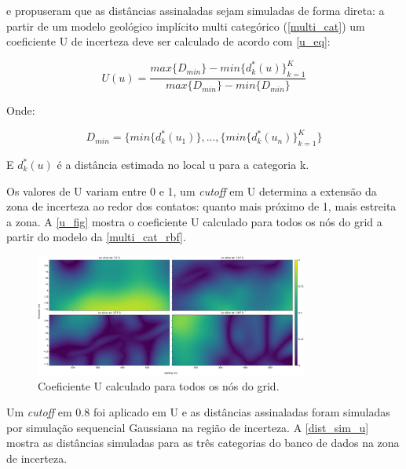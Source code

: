  e \cite{radtke_dissertacao} propuseram que as distâncias assinaladas sejam simuladas de forma direta: a partir de um modelo geológico implícito multi categórico (\autoref{multi_cat}) um coeficiente U de incerteza deve ser calculado de acordo com \autoref{u_eq}:

\begin{equation}\label{u_eq}
    U(u)=\frac{max\{D_{min}\}-min\{d^*_k(u)\}^K_{k=1}}{max\{D_{min}\}-min\{D_{min}\}}
\end{equation}

Onde:

\begin{equation}
    D_{min}=\{min\{d^*_k(u_1)\},...,\{min\{d^*_k(u_n)\}^K_{k=1}\}
\end{equation}

E $d^*_k(u)$ é a distância estimada no local u para a categoria k.

Os valores de U variam entre 0 e 1, um \textit{cutoff} em U determina a extensão da zona de incerteza ao redor dos contatos: quanto mais próximo de 1, mais estreita a zona. A \autoref{u_fig} mostra o coeficiente U calculado para todos os nós do grid a partir do modelo da \autoref{multi_cat_rbf}.

\begin{figure}[!ht]
	\caption{\label{u_fig}Coeficiente U calculado para todos os nós do grid.}
	\begin{center}
		\includegraphics[width=0.8\textwidth]{capitulo_2/u_coef.png}
	\end{center}
\end{figure}

Um \textit{cutoff} em 0.8 foi aplicado em U e as distâncias assinaladas foram simuladas por simulação sequencial Gaussiana na região de incerteza. A \autoref{dist_sim_u} mostra as distâncias simuladas para as três categorias do banco de dados na zona de incerteza. 

